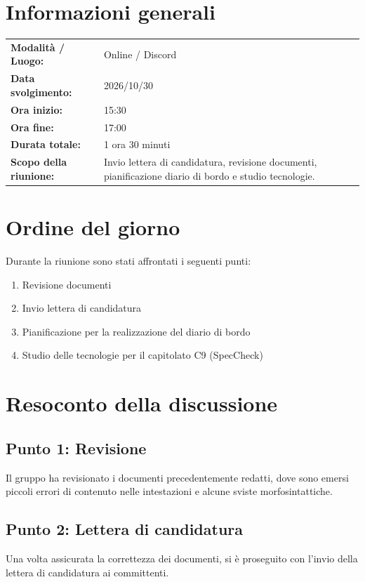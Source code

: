 \documentclass[a4paper, 11pt]{article}
\begin{document}
\newpage
\tableofcontents
\newpage


\section{Informazioni generali}
\begin{tabularx}{\textwidth}{l X}
    \textbf{Modalità / Luogo:} & Online / Discord \\
    \textbf{Data svolgimento:} & 2026/10/30 \\
    \textbf{Ora inizio:} & 15:30 \\
    \textbf{Ora fine:} & 17:00 \\
    \textbf{Durata totale:} & 1 ora 30 minuti \\
    \textbf{Scopo della riunione:} & Invio lettera di candidatura, revisione documenti, pianificazione diario di bordo e studio tecnologie. \\
\end{tabularx}

\newpage


\section{Ordine del giorno}
Durante la riunione sono stati affrontati i seguenti punti:
\begin{enumerate}
    \item Revisione documenti
    \item Invio lettera di candidatura
    \item Pianificazione per la realizzazione del diario di bordo
    \item Studio delle tecnologie per il capitolato C9 (SpecCheck)
\end{enumerate}

\newpage


\section{Resoconto della discussione}

\subsection{Punto 1: Revisione}
Il gruppo ha revisionato i documenti precedentemente redatti, dove sono emersi piccoli errori di contenuto nelle intestazioni e alcune sviste morfosintattiche.  

\subsection{Punto 2: Lettera di candidatura}
Una volta assicurata la correttezza dei documenti, si è proseguito con l'invio della lettera di candidatura ai committenti.
\end{document}
